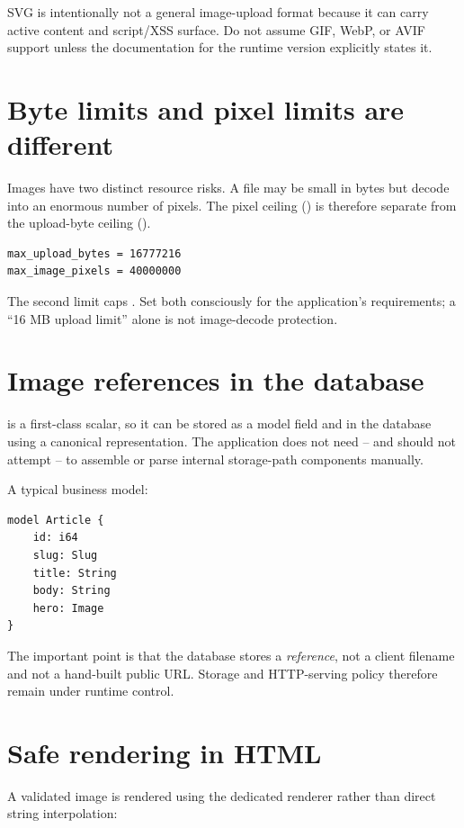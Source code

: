 SVG is intentionally not a general image-upload format because it can carry active content and script/XSS surface. Do not assume GIF, WebP, or AVIF support unless the documentation for the runtime version explicitly states it.

\section{Byte limits and pixel limits are different}

Images have two distinct resource risks. A file may be small in bytes but decode into an enormous number of pixels. The pixel ceiling () is therefore separate from the upload-byte ceiling ().

\begin{lstlisting}
max_upload_bytes = 16777216
max_image_pixels = 40000000
\end{lstlisting}

The second limit caps . Set both consciously for the application's requirements; a ``16 MB upload limit'' alone is not image-decode protection.

\section{Image references in the database}

 is a first-class scalar, so it can be stored as a model field and in the database using a canonical representation. The application does not need -- and should not attempt -- to assemble or parse internal storage-path components manually.

A typical business model:

\begin{lstlisting}[language=Velran]
model Article {
    id: i64
    slug: Slug
    title: String
    body: String
    hero: Image
}
\end{lstlisting}

The important point is that the database stores a \emph{reference}, not a client filename and not a hand-built public URL. Storage and HTTP-serving policy therefore remain under runtime control.

\newpage
\section{Safe rendering in HTML}

A validated image is rendered using the dedicated renderer rather than direct string interpolation:

